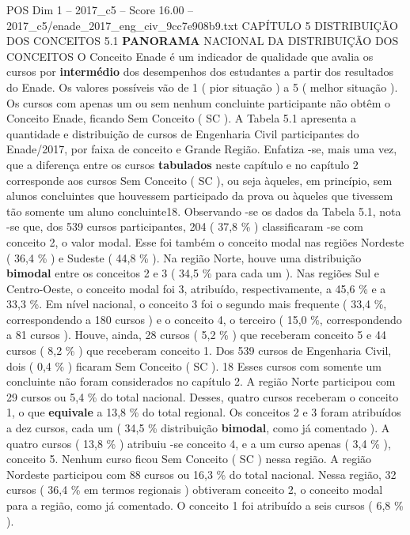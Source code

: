 \begin{textsample}{POS Dim 1 – 2017\_c5 – Score 16.00 – 2017\_c5/enade\_2017\_eng\_civ\_9cc7e908b9.txt}  \label{ex:f1_pos_051}
CAPÍTULO 5 DISTRIBUIÇÃO DOS CONCEITOS 5.1 \textbf{PANORAMA} NACIONAL DA DISTRIBUIÇÃO DOS CONCEITOS O Conceito Enade é um indicador de qualidade que avalia os cursos por \textbf{intermédio} dos desempenhos dos estudantes a partir dos resultados do Enade.
Os valores possíveis vão de 1 ( pior situação ) a 5 ( melhor situação ).
Os cursos com apenas um ou sem nenhum concluinte participante não obtêm o Conceito Enade, ficando Sem Conceito ( SC ).
A Tabela 5.1 apresenta a quantidade e distribuição de cursos de Engenharia Civil participantes do Enade/2017, por faixa de conceito e Grande Região.
Enfatiza -se, mais uma vez, que a diferença entre os cursos \textbf{tabulados} neste capítulo e no capítulo 2 corresponde aos cursos Sem Conceito ( SC ), ou seja àqueles, em princípio, sem alunos concluintes que houvessem participado da prova ou àqueles que tivessem tão somente um aluno concluinte18.
Observando -se os dados da Tabela 5.1, nota -se que, dos 539 cursos participantes, 204 ( 37,8 \% ) classificaram -se com conceito 2, o valor modal.
Esse foi também o conceito modal nas regiões Nordeste ( 36,4 \% ) e Sudeste ( 44,8 \% ).
Na região Norte, houve uma distribuição \textbf{bimodal} entre os conceitos 2 e 3 ( 34,5 \% para cada um ).
Nas regiões Sul e Centro-Oeste, o conceito modal foi 3, atribuído, respectivamente, a 45,6 \% e a 33,3 \%.
Em nível nacional, o conceito 3 foi o segundo mais frequente ( 33,4 \%, correspondendo a 180 cursos ) e o conceito 4, o terceiro ( 15,0 \%, correspondendo a 81 cursos ).
Houve, ainda, 28 cursos ( 5,2 \% ) que receberam conceito 5 e 44 cursos ( 8,2 \% ) que receberam conceito 1.
Dos 539 cursos de Engenharia Civil, dois ( 0,4 \% ) ficaram Sem Conceito ( SC ). 18 Esses cursos com somente um concluinte não foram considerados no capítulo 2.
A região Norte participou com 29 cursos ou 5,4 \% do total nacional.
Desses, quatro cursos receberam o conceito 1, o que \textbf{equivale} a 13,8 \% do total regional.
Os conceitos 2 e 3 foram atribuídos a dez cursos, cada um ( 34,5 \% distribuição \textbf{bimodal}, como já comentado ).
A quatro cursos ( 13,8 \% ) atribuiu -se conceito 4, e a um curso apenas ( 3,4 \% ), conceito 5.
Nenhum curso ficou Sem Conceito ( SC ) nessa região.
A região Nordeste participou com 88 cursos ou 16,3 \% do total nacional.
Nessa região, 32 cursos ( 36,4 \% em termos regionais ) obtiveram conceito 2, o conceito modal para a região, como já comentado.
O conceito 1 foi atribuído a seis cursos ( 6,8 \% ).

\end{textsample}
